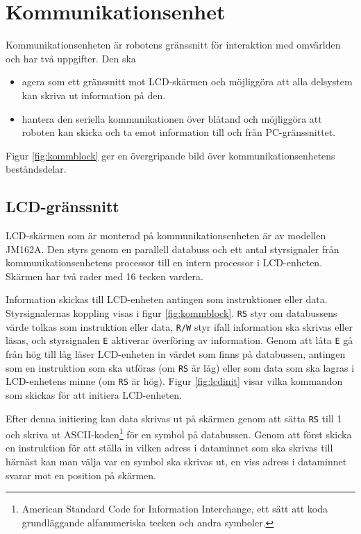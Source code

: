 \section{Kommunikationsenhet}
Kommunikationsenheten är robotens gränssnitt för interaktion med omvärlden och har två uppgifter. Den ska
\begin{itemize}
\item agera som ett gränssnitt mot LCD-skärmen och möjliggöra att alla delsystem kan skriva ut information på den.
\item hantera den seriella kommunikationen över blåtand och möjliggöra att roboten kan skicka och ta emot information till och från PC-gränssnittet.
\end{itemize}

Figur \ref{fig:kommblock} ger en övergripande bild över kommunikationsenhetens beståndsdelar.


\subsection{LCD-gränssnitt}
LCD-skärmen som är monterad på kommunikationsenheten är av modellen JM162A. Den styrs genom en parallell databuss och ett antal styrsignaler från kommunikationsenhetens processor till en intern processor i LCD-enheten. Skärmen har två rader med 16 tecken vardera.

Information skickas till LCD-enheten antingen som instruktioner eller data. Styrsignalernas koppling visas i figur \ref{fig:kommblock}. \verb|RS| styr om databussens värde tolkas som instruktion eller data, \verb|R/W| styr ifall information ska skrivas eller läsas, och styrsignalen \verb|E| aktiverar överföring av information. Genom att låta \verb|E| gå från hög till låg läser LCD-enheten in värdet som finns på databussen, antingen som en instruktion som ska utföras (om \verb|RS| är låg) eller som data som ska lagras i LCD-enhetens minne (om \verb|RS| är hög). Figur \ref{fig:lcdinit} visar vilka kommandon som skickas för att initiera LCD-enheten.


Efter denna initiering kan data skrivas ut på skärmen genom att sätta \verb|RS| till 1 och skriva ut ASCII-koden\footnote{American Standard Code for Information Interchange, ett sätt att koda grundläggande alfanumeriska tecken och andra symboler.} för en symbol på databussen. Genom att först skicka en instruktion för att ställa in vilken adress i dataminnet som ska skrivas till härnäst kan man välja var en symbol ska skrivas ut, en viss adress i dataminnet svarar mot en position på skärmen.

